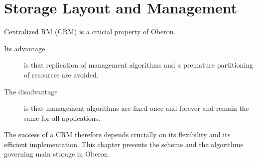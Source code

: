 \chapter{Storage Layout and Management}
\label{ch:MM}
Centralized RM (CRM) is a crucial property of Oberon.
\begin{description}
  \item[Its advantage] is that replication of management algorithms and a premature partitioning
    of resources are avoided.
  \item[The disadvantage] is that management algorithms are fixed once and forever and remain
    the same for all applications.
\end{description}
The success of a CRM therefore depends crucially on its flexibility and its efficient implementation.
This chapter presents the scheme and the algorithms governing main storage in Oberon.

